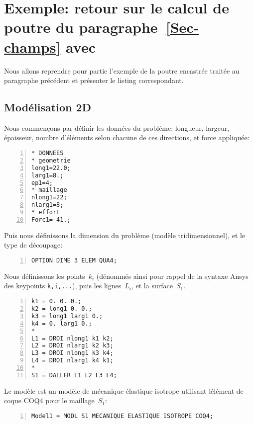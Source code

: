 \section{Exemple: retour sur le calcul de poutre du paragraphe~\ref{Sec-champs} avec \castem}
Nous allons reprendre pour partie l'exemple de la poutre encastrée traitée au paragraphe précédent et présenter le listing \castem correspondant.

\medskip
\subsection{Modélisation 2D}

Nous commençons par définir les données du problème: longueur, largeur, épaisseur, nombre d'éléments selon chacune de ces directions, et force appliquée:

\begin{Verbatim}[numbers=left,numbersep=3pt]
* DONNEES
* geometrie
long1=22.0;
larg1=8.;
ep1=4;
* maillage
nlong1=22;
nlarg1=8;
* effort
Forc1=-41.;
\end{Verbatim}

\medskip
Puis nous définissons la dimension du problème (modèle tridimensionnel), et le type de découpage:

\begin{Verbatim}[numbers=left,numbersep=3pt,firstnumber=last]
OPTION DIME 3 ELEM QUA4;
\end{Verbatim}

\medskip
Nous définissons les points~$k_i$ (dénommés ainsi pour rappel de la syntaxe Ansys des keypoints \verb|k,i,...|), puis les lignes~$L_i$, et la surface~$S_1$.

\begin{Verbatim}[numbers=left,numbersep=3pt,firstnumber=last]
k1 = 0. 0. 0.;
k2 = long1 0. 0.;
k3 = long1 larg1 0.;
k4 = 0. larg1 0.;
*
L1 = DROI nlong1 k1 k2;
L2 = DROI nlarg1 k2 k3;
L3 = DROI nlong1 k3 k4;
L4 = DROI nlarg1 k4 k1;
*
S1 = DALLER L1 L2 L3 L4;
\end{Verbatim}

\medskip
Le modèle est un modèle de mécanique élastique isotrope utilisant lélément de coque COQ4 pour le maillage~$S_1$:

\begin{Verbatim}[numbers=left,numbersep=3pt,firstnumber=last]
Model1 = MODL S1 MECANIQUE ELASTIQUE ISOTROPE COQ4;
\end{Verbatim}

